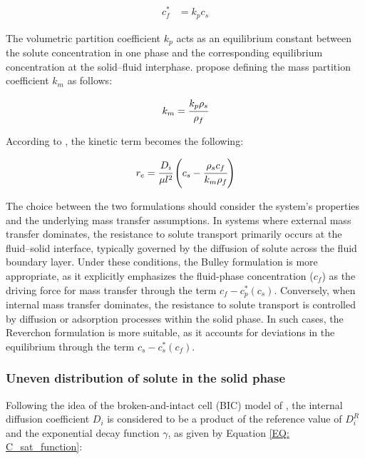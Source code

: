 \documentclass[a4paper,fleqn]{cas-dc}
\begin{document}
	{\footnotesize
		\begin{align} \label{Linear_equilibirum}
			c_f^* &= k_p c_s
	\end{align} }
	
	The volumetric partition coefficient $k_p$ acts as an equilibrium constant between the solute concentration in one phase and the corresponding equilibrium concentration at the solid--fluid interphase. \citet{Spiro2007} propose defining the mass partition coefficient $k_m$ as follows: 
	
	{\footnotesize
		\begin{align}
			k_m = \cfrac{k_p \rho_s}{\rho_f}
	\end{align} }
	
	According to \citet{Reverchon1996}, the kinetic term becomes the following:
	
	{\footnotesize
		\begin{equation}
			\label{Model_kinetic_no_sat}
			r_e = \cfrac{D_i}{ \mu l^2 } \left(c_s - \cfrac{\rho_s c_f}{k_m \rho_f} \right)
	\end{equation} }

	The choice between the two formulations should consider the system's properties and the underlying mass transfer assumptions. In systems where external mass transfer dominates, the resistance to solute transport primarily occurs at the fluid--solid interface, typically governed by the diffusion of solute across the fluid boundary layer. Under these conditions, the Bulley formulation is more appropriate, as it explicitly emphasizes the fluid-phase concentration ($c_f$) as the driving force for mass transfer through the term $c_f - c_p^*(c_s)$. Conversely, when internal mass transfer dominates, the resistance to solute transport is controlled by diffusion or adsorption processes within the solid phase. In such cases, the Reverchon formulation is more suitable, as it accounts for deviations in the equilibrium through the term $c_s - c_s^*(c_f)$.
	
	\subsubsection{Uneven distribution of solute in the solid phase} \label{CH: Gamma_Function}
	
	Following the idea of the broken-and-intact cell (BIC) model of \citet{Sovova2017}, the internal diffusion coefficient $D_i$ is considered to be a product of the reference value of $D_i^R$ and the exponential decay function $\gamma$, as given by Equation \ref{EQ: C_sat_function}:
	
\end{document}
